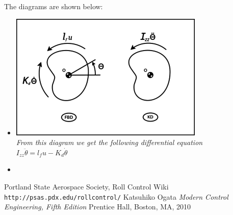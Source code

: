 \documentclass[12pt]{article}
\begin{document}
\begin{description}
		The diagrams are shown below:
		\begin{itemize}
			\item[] \includegraphics[scale=.5]{350x250-RollFBD.png} \\
			
				\textit{From this diagram we get the following differential equation}\\
				\textit{$I_{zz}\ddot{\theta} = l_{f}u - K_{d}\dot{\theta}$} \cite{PSAS} \\
			
			\item[]

				
		\end{itemize}
		
\end{description}
 
\newpage
 \begin{thebibliography}{9}
 Portland State Aerospace Society, Roll Control Wiki
 \texttt{http://psas.pdx.edu/rollcontrol/}
 Katsuhiko Ogata
 \textit{Modern Control Engineering, Fifth Edition}
 Prentice Hall, Boston, MA, 2010
 \end{thebibliography}
\end{document}
